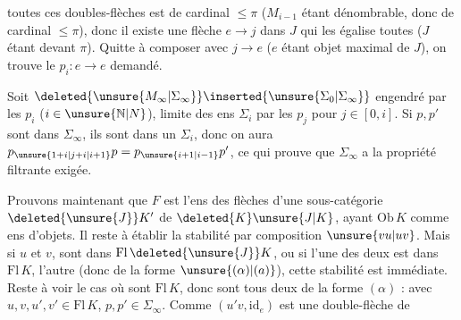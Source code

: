 toutes ces doubles-flèches est de cardinal $\leq\pi$ ($M_{i-1}$ étant dénombrable, donc de cardinal $\leq\pi$), donc il existe une flèche $e\longrightarrow j$ dans $J$ qui les égalise toutes ($J$ étant  devant $\pi$). Quitte à composer avec $j\longrightarrow e$ ($e$ étant objet maximal de $J$), on trouve le $p_i:e\longrightarrow e$ demandé.

Soit  $\deleted{\unsure{M_{\infty}|\Sigma_{\infty}}}\inserted{\unsure{\Sigma_0|\Sigma_{\infty}}}$    engendré par les $p_i$ ($i\in\unsure{\mathbb{N}|N}$),  limite  des ens  $\Sigma_i$  par les $p_j$ pour $j\in[0,i]$. Si $p,p'$ sont dans $\Sigma_\infty$, ils sont dans un \inserted{$=$} $\Sigma_i$, donc on aura $p_{\unsure{1+i|j+i|i+1}}p=p_{\unsure{i+1|i-1}}p'$, ce qui prouve que $\Sigma_\infty$ a la propriété filtrante exigée.

Prouvons maintenant que $F$ est l'ens des flèches d'une sous-catégorie $\deleted{\unsure{J}}K'$ de $\deleted{K}\unsure{J|K}$, ayant $\mathrm{Ob}\,K$ comme ens d'objets. Il reste à établir la stabilité par composition $\unsure{vu|uv}$. Mais si $u$ et $v$,  sont dans $\mathrm{Fl}\,\deleted{\unsure{J}}K$,  ou si l'une des deux est dans $\mathrm{Fl}\,K$, l'autre  (donc de la forme $\unsure{(\alpha)|(a)}$), cette stabilité est immédiate. Reste à voir le cas où  sont   $\mathrm{Fl}\,K$, donc sont tous deux de la forme $(\alpha)$ :
avec $u,v,u',v'\in\mathrm{Fl}\,K$, $p,p'\in\Sigma_{\infty}$. Comme $(u'v,\mathrm{id}_e)$ est une double-flèche de
